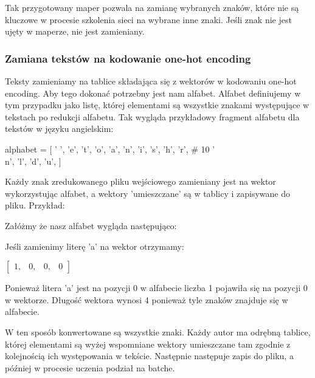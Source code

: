 Tak przygotowany maper pozwala na zamianę wybranych znaków, które nie są kluczowe w procesie 
szkolenia sieci na wybrane inne znaki. Jeśli znak nie jest ujęty w maperze, nie jest zamieniany. 

\subsubsection{Zamiana tekstów na kodowanie one-hot encoding}
Teksty zamieniamy na tablice składająca się z wektorów w kodowaniu one-hot encoding. 
Aby tego dokonać potrzebny jest nam alfabet. Alfabet definiujemy w tym przypadku jako listę, której 
elementami są wszystkie znakami występujące w tekstach po redukcji alfabetu. Tak wygląda przykładowy fragment alfabetu dla tekstów
 w języku angielskim:
\begin{python}
alphabet = [
    ' ',
    'e',
    't',
    'o',
    'a',
    'n',
    'i',
    's',
    'h',
    'r',  # 10
    '\\n',
    'l',
    'd',
    'u',
]
\end{python}

Każdy znak zredukowanego pliku wejściowego zamieniany jest na wektor wykorzystując alfabet, 
a wektory 'umieszczane' są w tablicy i zapisywane do pliku. Przykład:

Załóżmy że nasz alfabet wygląda następująco:

Jeśli zamienimy literę 'a' na wektor otrzymamy: 
 
\vspace{2mm}
$
\begin{bmatrix} 
1, & 0, & 0, & 0
\end{bmatrix} 
$
\vspace{2mm}

Ponieważ litera 'a' jest na pozycji 0 w alfabecie liczba 1 pojawiła się na pozycji 0 w wektorze.
Długość wektora wynosi 4 ponieważ tyle znaków znajduje się w alfabecie.

W ten sposób konwertowane są wszystkie znaki.
Każdy autor ma odrębną tablice, której elementami są wyżej wspomniane wektory umieszczane tam zgodnie 
z kolejnością ich występowania w tekście. 
Następnie następuje zapis do pliku, a później w procesie uczenia podział na batche.